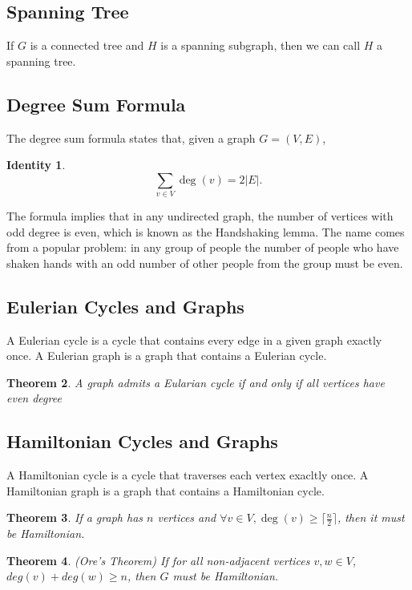 \documentclass{article}
\newtheorem{theorem}{Theorem}[section]
\newtheorem{identity}[theorem]{Identity}
\begin{document}
\subsection{Spanning Tree}
If $G$ is a connected tree and $H$ is a spanning subgraph, then we can call $H$ a spanning tree.

\subsection{Degree Sum Formula}
The degree sum formula states that, given a graph $G=(V,E)$,
\begin{identity}
\[
\sum _{v\in V}\deg(v)=2|E|.
\]
\end{identity}

The formula implies that in any undirected graph, the number of vertices with odd degree is even, which is known as the Handshaking lemma. The name comes from a popular problem: in any group of people the number of people who have shaken hands with an odd number of other people from the group must be even.

\subsection{Eulerian Cycles and Graphs}
A Eulerian cycle is a cycle that contains every edge in a given graph exactly once. A Eulerian graph is a graph that contains a Eulerian cycle.

\begin{theorem}
A graph admits a Eularian cycle if and only if all vertices have even degree
\end{theorem}

\subsection{Hamiltonian Cycles and Graphs}
A Hamiltonian cycle is a cycle that traverses each vertex exacltly once. A Hamiltonian graph is a graph that contains a Hamiltonian cycle.

\begin{theorem}
If a graph has $n$ vertices and $\forall v \in V, \deg(v) \geq  \lceil \frac{n}{2} \rceil$, then it must be Hamiltonian.
\end{theorem}


\begin{theorem}
(Ore's Theorem) If for all non-adjacent vertices $v,w \in V$, $deg(v) + deg(w) \geq n$, then $G$ must be Hamiltonian.
\end{theorem}
\end{document}
